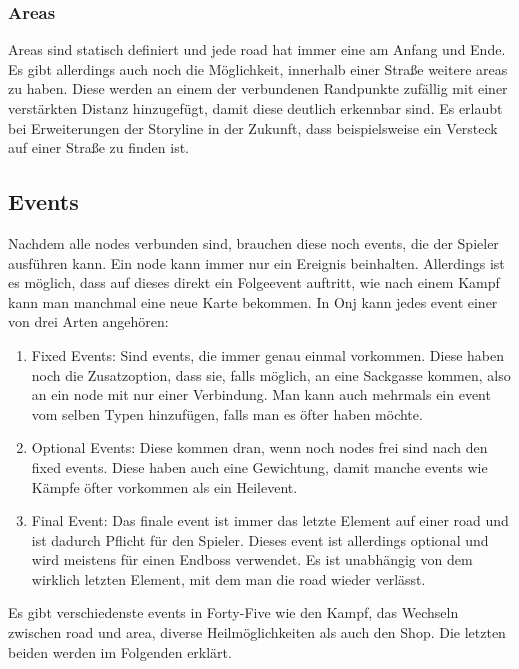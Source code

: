 \subsubsection{Areas}\label{subsubsec:areas}
Areas sind statisch definiert und jede road hat immer eine am Anfang und Ende.
Es gibt allerdings auch noch die Möglichkeit, innerhalb einer Straße weitere areas zu haben.
Diese werden an einem der verbundenen Randpunkte zufällig mit einer verstärkten Distanz hinzugefügt, damit diese deutlich erkennbar sind.
Es erlaubt bei Erweiterungen der Storyline in der Zukunft, dass beispielsweise ein Versteck auf einer Straße zu finden ist.

\subsection{Events}\label{subsec:events}
Nachdem alle nodes verbunden sind, brauchen diese noch events, die der Spieler ausführen kann.
Ein node kann immer nur ein Ereignis beinhalten.
Allerdings ist es möglich, dass auf dieses direkt ein Folgeevent auftritt, wie \zB nach einem Kampf kann man manchmal eine neue Karte bekommen.
In Onj kann jedes event einer von drei Arten angehören:

\begin{enumerate}
    \item Fixed Events: Sind events, die immer genau einmal vorkommen.
    Diese haben noch die Zusatzoption, dass sie, falls möglich, an eine Sackgasse kommen, also an ein node mit nur einer Verbindung.
    Man kann auch mehrmals ein event vom selben Typen hinzufügen, falls man es öfter haben möchte.
    \item Optional Events: Diese kommen dran, wenn noch nodes frei sind nach den fixed events.
    Diese haben auch eine Gewichtung, damit manche events wie Kämpfe öfter vorkommen als \zB ein Heilevent.
    \item Final Event: Das finale event ist immer das letzte Element auf einer road und ist dadurch Pflicht für den Spieler.
    Dieses event ist allerdings optional und wird meistens für einen Endboss verwendet.
    Es ist unabhängig von dem wirklich letzten Element, mit dem man die road wieder verlässt.
\end{enumerate}

Es gibt verschiedenste events in Forty-Five wie den Kampf, das Wechseln zwischen road und area, diverse Heilmöglichkeiten als auch den Shop.
Die letzten beiden werden im Folgenden erklärt.

